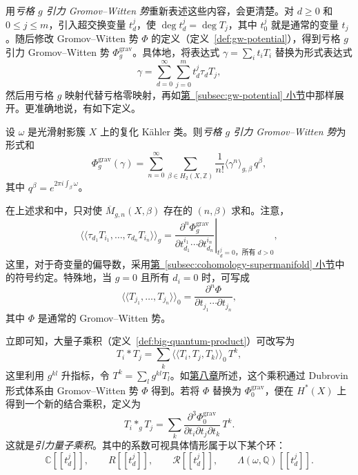 用\emph{亏格 $g$ 引力 Gromov--Witten 势}重新表述这些内容，会更清楚。对 $d\ge0$ 和 $0\le j\le m$，引入超交换变量 $t_d^j$，使 $\deg t_d^j=\deg T_j$，其中 $t_0^j$ 就是通常的变量 $t_j$。随后修改 Gromov--Witten 势 $\Phi$ 的定义（定义~\ref{def:gw-potential}），得到亏格 $g$ 引力 Gromov--Witten 势 $\Phi_g^{\mathrm{grav}}$。具体地，将表达式 $\gamma=\sum_i t_iT_i$ 替换为形式表达式
\[
\gamma=\sum_{d=0}^{\infty}\sum_{j=0}^m t_d^j\tau_dT_j,
\]
然后用亏格 $g$ 映射代替亏格零映射，再如\hyperref[subsec:gw-potential]{第~\ref*{subsec:gw-potential} 小节}中那样展开。更准确地说，有如下定义。
\begin{definition}\label{def:gravitational-gw-potential}
设 $\omega$ 是光滑射影簇 $X$ 上的复化 Kähler 类。则\emph{亏格 $g$ 引力 Gromov--Witten 势}为形式和
\[
\Phi_g^{\mathrm{grav}}(\gamma)
=\sum_{n=0}^{\infty}\sum_{\beta\in H_2(X,\mathbb Z)}
\frac1{n!}\langle\gamma^n\rangle_{g,\beta}\,q^\beta,
\]
其中 $q^\beta=e^{2\pi i\int_\beta\omega}$。
\end{definition}
在上述求和中，只对使 $\overline M_{g,n}(X,\beta)$ 存在的 $(n,\beta)$ 求和。注意，
\begin{equation}\label{eq:gravitational-potential-derivatives}
\langle\!\langle\tau_{d_1}T_{i_1},\ldots,\tau_{d_n}T_{i_n}\rangle\!\rangle_g
=\left.\frac{\partial^n\Phi_g^{\mathrm{grav}}}
{\partial t_{d_1}^{i_1}\cdots\partial t_{d_n}^{i_n}}
\right|_{t_d^j=0\text{，所有 }d>0},
\end{equation}
这里，对于奇变量的偏导数，采用\hyperref[subsec:cohomology-supermanifold]{第~\ref*{subsec:cohomology-supermanifold} 小节}中的符号约定。特殊地，当 $g=0$ 且所有 $d_i=0$ 时，可写成
\[
\langle\!\langle T_{j_1},\ldots,T_{j_n}\rangle\!\rangle_0
=\frac{\partial^n\Phi}{\partial t_{j_1}\cdots\partial t_{j_n}},
\]
其中 $\Phi$ 是通常的 Gromov--Witten 势。

立即可知，大量子乘积（定义~\ref{def:big-quantum-product}）可改写为
\begin{equation}\label{eq:big-quantum-product-couplings}
T_i*T_j=\sum_k\langle\!\langle T_i,T_j,T_k\rangle\!\rangle_0\,T^k,
\end{equation}
这里利用 $g^{kl}$ 升指标，令 $T^k=\sum_l g^{kl}T_l$。如\hyperref[chap:quantum-cohomology]{第八章}所述，这个乘积通过 Dubrovin 形式体系由 Gromov--Witten 势 $\Phi$ 得到。若将 $\Phi$ 替换为 $\Phi_0^{\mathrm{grav}}$，便在 $H^*(X)$ 上得到一个新的结合乘积，定义为
\[
T_i*_gT_j=\sum_k\frac{\partial^3\Phi_0^{\mathrm{grav}}}
{\partial t_i\partial t_j\partial t_k}\,T^k.
\]
这就是\emph{引力量子乘积}。其中的系数可视具体情形属于以下某个环：
\[
\mathbb C[[t_d^j]],\qquad R[[t_d^j]],\qquad
\mathcal R[[t_d^j]],\qquad\Lambda(\omega,\mathbb Q)[[t_d^j]].
\]

